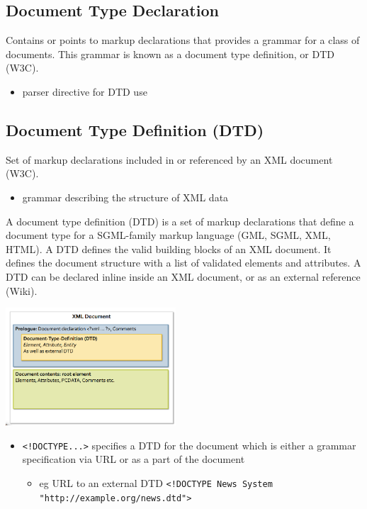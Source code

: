 \documentclass[11pt]{article}
\begin{document}
\subsection{Document Type Declaration}
\label{sec:org27fdbbd}
Contains or points to markup declarations that provides a grammar for a class of documents. This grammar is known as a document type definition, or DTD (W3C).
\begin{itemize}
\item parser directive for DTD use
\end{itemize}
\subsection{Document Type Definition (DTD)}
\label{sec:org752da27}
Set of markup declarations included in or referenced by an XML document (W3C).
\begin{itemize}
\item grammar describing the structure of XML data
\end{itemize}

A document type definition (DTD) is a set of markup declarations that define a document type for a SGML-family markup language (GML, SGML, XML, HTML).
A DTD defines the valid building blocks of an XML document. It defines the document structure with a list of validated elements and attributes. A DTD can be declared inline inside an XML document, or as an external reference (Wiki).

\begin{center}
\includegraphics[width=240px]{./dtd.png}
\label{org8d8af9b}
\end{center}

\begin{itemize}
\item \texttt{<!DOCTYPE...>} specifies a DTD for the document which is either a grammar specification via URL or as a part of the document
\begin{itemize}
\item eg URL to an external DTD \texttt{<!DOCTYPE News System "http://example.org/news.dtd">}
\end{itemize}
\end{itemize}
\end{document}

